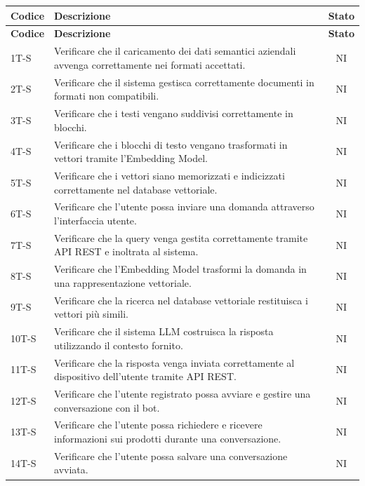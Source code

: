 \documentclass{article}
\begin{document}
\begin{longtable}{|>{\centering\arraybackslash}m{}|>{\raggedright\arraybackslash}m{}|c|}
    \hline
    \textbf{Codice} & \textbf{Descrizione} & \textbf{Stato} \\
    \hline
    \endfirsthead
    \hline
    \textbf{Codice} & \textbf{Descrizione} & \textbf{Stato} \\
    \hline
    \endhead
    \hline
    \endfoot
    \hline
    1T-S & Verificare che il caricamento dei dati semantici aziendali avvenga correttamente nei formati accettati. & NI \\
    \hline
    2T-S & Verificare che il sistema gestisca correttamente documenti in formati non compatibili. & NI \\
    \hline
    3T-S & Verificare che i testi vengano suddivisi correttamente in blocchi. & NI \\
    \hline
    4T-S & Verificare che i blocchi di testo vengano trasformati in vettori tramite l’Embedding Model. & NI \\
    \hline
    5T-S & Verificare che i vettori siano memorizzati e indicizzati correttamente nel database vettoriale. & NI \\
    \hline
    6T-S & Verificare che l’utente possa inviare una domanda attraverso l’interfaccia utente. & NI \\
    \hline
    7T-S & Verificare che la query venga gestita correttamente tramite API REST e inoltrata al sistema. & NI \\
    \hline
    8T-S & Verificare che l’Embedding Model trasformi la domanda in una rappresentazione vettoriale. & NI \\
    \hline
    9T-S & Verificare che la ricerca nel database vettoriale restituisca i vettori più simili. & NI \\
    \hline
    10T-S & Verificare che il sistema LLM costruisca la risposta utilizzando il contesto fornito. & NI \\
    \hline
    11T-S & Verificare che la risposta venga inviata correttamente al dispositivo dell’utente tramite API REST. & NI \\
    \hline
    12T-S & Verificare che l’utente registrato possa avviare e gestire una conversazione con il bot. & NI \\
    \hline
    13T-S & Verificare che l’utente possa richiedere e ricevere informazioni sui prodotti durante una conversazione. & NI \\
    \hline
    14T-S & Verificare che l’utente possa salvare una conversazione avviata. & NI \\

\end{longtable}
\end{document}
